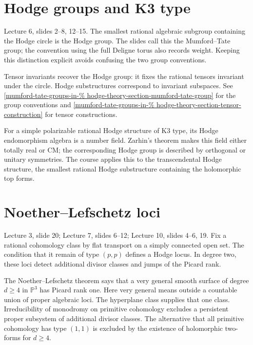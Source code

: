 \section{Hodge groups and K3 type}
\label{section-hodge-groups}

Lecture 6, slides 2--8, 12--15.
The smallest rational algebraic subgroup
containing the Hodge circle is the Hodge
group. The slides call this the
Mumford--Tate group; the convention using
the full Deligne torus also records weight.
Keeping this distinction explicit avoids
confusing the two group conventions.

Tensor invariants recover the Hodge group:
it fixes the rational tensors invariant
under the circle. Hodge substructures
correspond to invariant subspaces.
See \ref{mumford-tate-groups-in-%
hodge-theory-section-mumford-tate-group}
for the group conventions and
\ref{mumford-tate-groups-in-%
hodge-theory-section-tensor-construction}
for tensor constructions.

For a simple polarizable rational Hodge
structure of K3 type, its Hodge
endomorphism algebra is a number field.
Zarhin's theorem makes this field either
totally real or CM; the corresponding
Hodge group is described by orthogonal
or unitary symmetries. The course applies
this to the transcendental Hodge structure,
the smallest rational Hodge substructure
containing the holomorphic top forms.

\section{Noether--Lefschetz loci}
\label{section-noether-lefschetz}

Lecture 3, slide 20;
Lecture 7, slides 6--12;
Lecture 10, slides 4--6, 19.
Fix a rational cohomology class by flat
transport on a simply connected open set.
The condition that it remain of type
$(p,p)$ defines a Hodge locus. In degree
two, these loci detect additional divisor
classes and jumps of the Picard rank.

The Noether--Lefschetz theorem says that a
very general smooth surface of degree
$d\geq4$ in $\mathbb P^3$ has Picard rank
one. Here very general means outside a
countable union of proper algebraic loci.
The hyperplane class supplies that one
class. Irreducibility of monodromy on
primitive cohomology excludes a persistent
proper subsystem of additional divisor
classes. The alternative that all
primitive cohomology has type $(1,1)$ is
excluded by the existence of holomorphic
two-forms for $d\geq4$.

